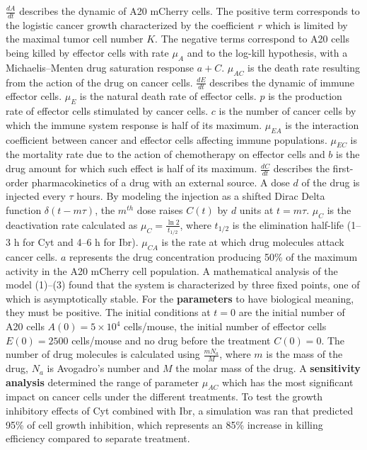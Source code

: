 $\frac{dA}{dt}$ describes the dynamic of A20 mCherry cells. The positive term corresponds to the logistic cancer growth characterized by the coefficient $r$ which is limited by the maximal tumor cell number $K$. 
The negative terms correspond to A20 cells being killed by effector cells with rate $\mu_A$ and to the log-kill hypothesis, with a Michaelis–Menten drug saturation response $a + C$. $\mu_{AC}$ is the death rate resulting from the action of the drug on cancer cells.
$\frac{dE}{dt}$ describes the dynamic of immune effector cells. $\mu_{E}$ is the natural death rate of effector cells. $p$ is the production rate of effector cells stimulated by cancer cells. $c$ is the number of cancer cells by which the immune system response is half of its maximum. 
$\mu_{EA}$ is the interaction coefficient between cancer and effector cells affecting immune populations. $\mu_{EC}$ is the mortality rate due to the action of chemotherapy on effector cells and $b$ is the drug amount for which such effect is half of its maximum.
$\frac{dC}{dt}$ describes the first-order pharmacokinetics of a drug with an external source. A dose $d$ of the drug is injected every $\tau$ hours. By modeling the injection as a shifted Dirac Delta function $\delta (t − m\tau)$, the $m^{th}$ dose raises $C(t)$ by $d$ units at $t=m\tau$. $\mu_C$ is the deactivation rate calculated as $\mu_C = \frac{\ln 2}{t_{1/2}}$, where $t_{1/2}$ is the elimination half-life (1–3 h for Cyt and 4–6 h for Ibr). $\mu_{CA}$ is the rate at which drug molecules attack cancer cells. 
$a$ represents the drug concentration producing 50\% of the maximum activity in the A20 mCherry cell population. A mathematical analysis of the model (1)–(3) found that the system is characterized by three fixed points, one of which is asymptotically stable.
For the \textbf{parameters} to have biological meaning, they must be positive. The initial conditions at $t=0$ are the initial number of A20 cells $A(0) = 5 \times 10^4$ cells/mouse, the initial number of effector cells $E(0) = 2500$ cells/mouse and no drug before the treatment $C(0)=0$. The number of drug molecules is calculated using $\frac{mN_a}{M}$, where $m$ is the mass of the drug, $N_a$ is Avogadro's number and $M$ the molar mass of the drug.
A \textbf{sensitivity analysis} determined the range of parameter $\mu_{AC}$ which has the most significant impact on cancer cells under the different treatments. To test the growth inhibitory effects of Cyt combined with Ibr, a simulation was ran that predicted 95\% of cell growth inhibition, which represents an 85\% increase in killing efficiency compared to separate treatment.
